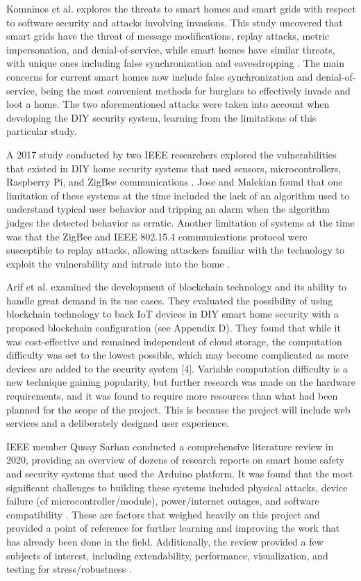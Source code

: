 \documentclass[conference]{IEEEtran}
\begin{document}
Komninos et al. explores the threats to smart homes and smart grids with respect to
software security and attacks involving invasions. This study uncovered that smart grids
have the threat of message modifications, replay attacks, metric impersonation, and
denial-of-service, while smart homes have similar threats, with unique ones including
false synchronization and eavesdropping \cite{komninosEtAl2014}. The main concerns for
current smart homes now include false synchronization and denial-of-service, being the
most convenient methods for burglars to effectively invade and loot a home. The two
aforementioned attacks were taken into account when developing the DIY security system,
learning from the limitations of this particular study.

A 2017 study conducted by two IEEE researchers explored the vulnerabilities that existed
in DIY home security systems that used sensors, microcontrollers, Raspberry Pi, and ZigBee
communications \cite{joseMalekian2017}. Jose and Malekian found that one limitation of
these systems at the time included the lack of an algorithm used to understand typical
user behavior and tripping an alarm when the algorithm judges the detected behavior as
erratic. Another limitation of systems at the time was that the ZigBee and IEEE 802.15.4
communications protocol were susceptible to replay attacks, allowing attackers familiar
with the technology to exploit the vulnerability and intrude
into the home \cite{joseMalekian2017}.

Arif et al. examined the development of blockchain technology and its ability to
handle great demand in its use cases. They evaluated the possibility of using blockchain
technology to back IoT devices in DIY smart home security with a proposed blockchain
configuration (see Appendix D). They found that while it was cost-effective and remained
independent of cloud storage, the computation difficulty was set to the lowest possible,
which may become complicated as more devices are added to the security system [4].
Variable computation difficulty is a new technique gaining popularity, but further
research was made on the hardware requirements, and it was found to require more
resources than what had been planned for the scope of the project.
This is because the project will include web services and a deliberately
designed user experience.

IEEE member Qusay Sarhan conducted a comprehensive literature review in 2020, providing an
overview of dozens of research reports on smart home safety and security systems that
used the Arduino platform. It was found that the most significant challenges to building
these systems included physical attacks, device failure (of microcontroller/module),
power/internet outages, and software compatibility \cite{sarhan2020}. These are factors
that weighed heavily on this project and provided a point of reference for further learning
and improving the work that has already been done in the field. Additionally, the review
provided a few subjects of interest, including extendability, performance, visualization,
and testing for stress/robustness \cite{sarhan2020}.
\end{document}
